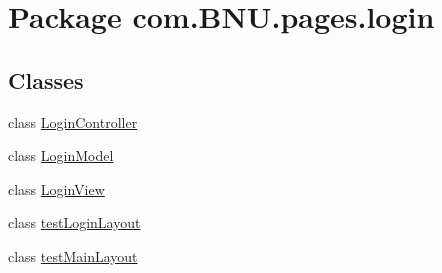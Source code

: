 \hypertarget{namespacecom_1_1_b_n_u_1_1pages_1_1login}{}\section{Package com.\+B\+N\+U.\+pages.\+login}
\label{namespacecom_1_1_b_n_u_1_1pages_1_1login}
\subsection*{Classes}
\begin{DoxyCompactItemize}
\item 
class \mbox{\hyperlink{classcom_1_1_b_n_u_1_1pages_1_1login_1_1_login_controller}{Login\+Controller}}
\item 
class \mbox{\hyperlink{classcom_1_1_b_n_u_1_1pages_1_1login_1_1_login_model}{Login\+Model}}
\item 
class \mbox{\hyperlink{classcom_1_1_b_n_u_1_1pages_1_1login_1_1_login_view}{Login\+View}}
\item 
class \mbox{\hyperlink{classcom_1_1_b_n_u_1_1pages_1_1login_1_1test_login_layout}{test\+Login\+Layout}}
\item 
class \mbox{\hyperlink{classcom_1_1_b_n_u_1_1pages_1_1login_1_1test_main_layout}{test\+Main\+Layout}}
\end{DoxyCompactItemize}
